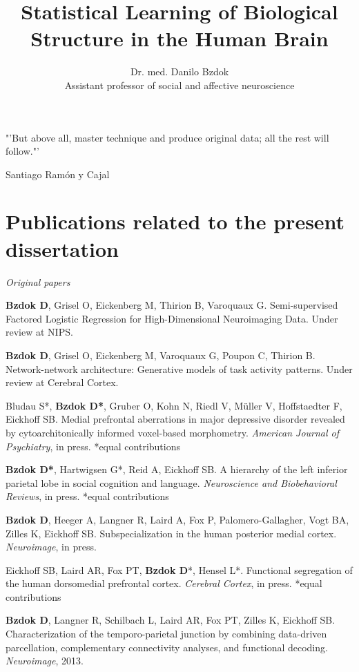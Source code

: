 \documentclass[authoryear,review,3p]{elsarticle}
\begin{document}
  
\begin{frontmatter}

\title{Statistical Learning of Biological Structure in the Human Brain}

\author{Dr. med. Danilo Bzdok\\
Assistant professor of social and affective neuroscience}

\end{frontmatter}

"'But above all, master technique and produce original data; 
all the rest will follow."'

Santiago Ram\'{o}n y Cajal

\bigskip

\newpage
\section*{Publications related to the present dissertation}
\linebreak
\textit{Original papers}

\textbf{Bzdok D}, Grisel O, Eickenberg M, Thirion B, Varoquaux G.
Semi-supervised Factored Logistic Regression for High-Dimensional
Neuroimaging Data. Under review at NIPS.

\textbf{Bzdok D}, Grisel O, Eickenberg M, Varoquaux G, Poupon C, Thirion B.
Network-network architecture: Generative models of task activity patterns.
Under review at Cerebral Cortex.

Bludau S*, \textbf{Bzdok D*}, Gruber O,
Kohn N, Riedl V, Müller V, Hoffstaedter F, Eickhoff SB.
Medial prefrontal aberrations in major depressive disorder
revealed by cytoarchitonically informed voxel-based morphometry.
\textit{American Journal of Psychiatry}, in press. *equal contributions

\textbf{Bzdok D*}, Hartwigsen G*, Reid A, Eickhoff SB.
A hierarchy of the left inferior parietal lobe in social cognition and
language.
\textit{Neuroscience and Biobehavioral Reviews}, in press. *equal contributions

\textbf{Bzdok D}, Heeger A, Langner R, Laird A, Fox P, Palomero-Gallagher,
Vogt BA, Zilles K, Eickhoff SB.
Subspecialization in the human posterior medial cortex.
\textit{Neuroimage}, in press.

Eickhoff SB, Laird AR, Fox PT, \textbf{Bzdok D}*, Hensel L*.
Functional segregation of the human dorsomedial prefrontal cortex.
\textit{Cerebral Cortex}, in press. *equal contributions

\textbf{Bzdok D}, Langner R, Schilbach L, Laird AR, Fox PT, Zilles K, Eickhoff SB.
Characterization of the temporo-parietal junction by combining data-driven
parcellation, complementary connectivity analyses, and functional decoding.
\textit{Neuroimage}, 2013.
\end{document}

